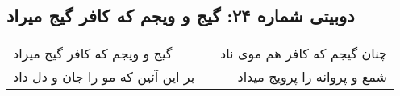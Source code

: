 \begin{center}
\section*{دوبیتی شماره ۲۴: گیج و ویجم که کافر گیج میراد}
\label{sec:024}
\begin{longtable}{l p{0.5cm} r}
گیج و ویجم که کافر گیج میراد
&&
چنان گیجم که کافر هم موی ناد
\\
بر این آئین که مو را جان و دل داد
&&
شمع و پروانه را پرویج میداد
\\
\end{longtable}
\end{center}

